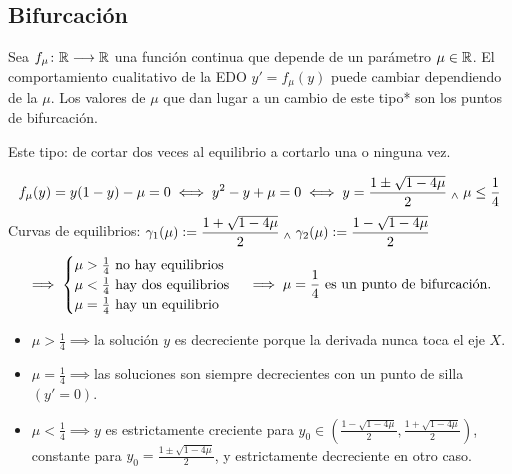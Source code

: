 \subsection{Bifurcación}
\begin{defn}
	Sea $f_\mu \colon \mathbb{R} \longrightarrow \mathbb{R}$ una función continua que depende de un parámetro $\mu \in \mathbb{R}$. El comportamiento cualitativo de la EDO $y'=f_\mu(y)$ puede cambiar dependiendo de la $\mu$. Los valores de $\mu$ que dan lugar a un cambio de este tipo* son los puntos de bifurcación.

	\hfill *Este tipo: de cortar dos veces al equilibrio a cortarlo una o ninguna vez.
\end{defn}

\begin{ejem}[$\{y'=y(1-y)-\mu \we y(x_0) = y_0\}$]
	\[f_\mu(y)=y(1-y)-\mu=0 \iff y^2-y+\mu=0 \iff y=\frac{1\pm \sqrt{1-4\mu}}{2} \; _{\wedge} \; \mu \leq \frac{1}{4}\]
	Curvas de equilibrios: $\displaystyle \gamma_1(\mu)\vcentcolon=\frac{1+\sqrt{1-4\mu}}{2} \; _{\wedge} \; \gamma_2(\mu)\vcentcolon=\frac{1-\sqrt{1-4\mu}}{2}$
	\[\implies \begin{cases}
			\mu > \frac{1}{4} \text{ no hay equilibrios}  \\
			\mu < \frac{1}{4} \text{ hay dos equilibrios} \\
			\mu = \frac{1}{4} \text{ hay un equilibrio}   \\
		\end{cases} \implies \mu =\frac{1}{4} \text{ es un punto de bifurcación.}\]
	\begin{itemize}
		\item $\mu > \frac{1}{4} \implies $la solución $y$ es decreciente porque la derivada nunca toca el eje $X$.
		\item $\mu = \frac{1}{4} \implies $las soluciones son siempre decrecientes con un punto de silla $(y'=0)$.
		\item $\mu < \frac{1}{4} \implies y$ es estrictamente creciente para $y_0 \in \left(\frac{1-\sqrt{1-4\mu}}{2}, \frac{1+\sqrt{1-4\mu}}{2}\right)$, constante para $y_0 = \frac{1\pm\sqrt{1-4\mu}}{2}$, y estrictamente decreciente en otro caso.
	\end{itemize}
\end{ejem}
